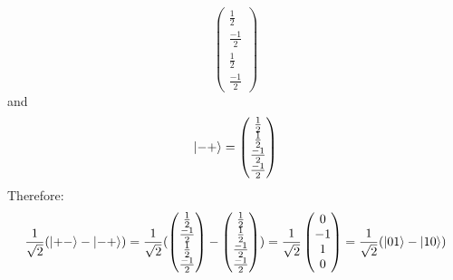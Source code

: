 \documentclass[12pt]{article}
\begin{document}
\begin{enumerate}[font=\bfseries]
\[\begin{pmatrix}
                \frac{1}{2} \\ \frac{-1}{2} \\ \frac{1}{2} \\ \frac{-1}{2} 
                \end{pmatrix}
                        \]
    and 
    \[\ket{-+} = \begin{pmatrix}
                \frac{1}{2} \\ \frac{1}{2} \\ \frac{-1}{2} \\ \frac{-1}{2} 
                \end{pmatrix}
                        \]
    Therefore:
    \[\frac{1}{\sqrt{2}}(\ket{+-} - \ket{-+}) = \frac{1}{\sqrt{2}} (\begin{pmatrix}
                \frac{1}{2} \\ \frac{-1}{2} \\ \frac{1}{2} \\ \frac{-1}{2} 
                \end{pmatrix} - \begin{pmatrix}
                \frac{1}{2} \\ \frac{1}{2} \\ \frac{-1}{2} \\ \frac{-1}{2} 
                \end{pmatrix} )  = \frac{1}{\sqrt{2}}
                \begin{pmatrix}
                0 \\ -1 \\ 1 \\ 0 
                \end{pmatrix} = \frac{1}{\sqrt{2}}(\ket{01} - \ket{10})
                        \]
\end{enumerate}
\end{document}
